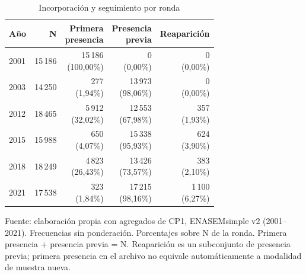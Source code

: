 \begin{table}[!htbp]
\centering
\caption{Incorporación y seguimiento por ronda}\label{tab:cp1-entradas}
\small\setlength{\tabcolsep}{4pt}
\renewcommand{\arraystretch}{1.15}
\begin{tabular}{lrrrr}
\toprule
\textbf{Año} & \textbf{N} & \shortstack[c]{\textbf{Primera}\\\textbf{presencia}} & \shortstack[c]{\textbf{Presencia}\\\textbf{previa}} & \textbf{Reaparición} \\
\midrule
2001 & 15\,186 & \shortstack[r]{15\,186\\(100,00\%)} & \shortstack[r]{0\\(0,00\%)} & \shortstack[r]{0\\(0,00\%)} \\
2003 & 14\,250 & \shortstack[r]{277\\(1,94\%)} & \shortstack[r]{13\,973\\(98,06\%)} & \shortstack[r]{0\\(0,00\%)} \\
2012 & 18\,465 & \shortstack[r]{5\,912\\(32,02\%)} & \shortstack[r]{12\,553\\(67,98\%)} & \shortstack[r]{357\\(1,93\%)} \\
2015 & 15\,988 & \shortstack[r]{650\\(4,07\%)} & \shortstack[r]{15\,338\\(95,93\%)} & \shortstack[r]{624\\(3,90\%)} \\
2018 & 18\,249 & \shortstack[r]{4\,823\\(26,43\%)} & \shortstack[r]{13\,426\\(73,57\%)} & \shortstack[r]{383\\(2,10\%)} \\
2021 & 17\,538 & \shortstack[r]{323\\(1,84\%)} & \shortstack[r]{17\,215\\(98,16\%)} & \shortstack[r]{1\,100\\(6,27\%)} \\
\bottomrule
\end{tabular}
\par\medskip
\parbox{\linewidth}{\footnotesize Fuente: elaboración propia con agregados de CP1, ENASEMsimple v2 (2001--2021). Frecuencias sin ponderación. Porcentajes sobre N de la ronda. Primera presencia + presencia previa = N. Reaparición es un subconjunto de presencia previa; primera presencia en el archivo no equivale automáticamente a modalidad de muestra nueva.}
\end{table}
